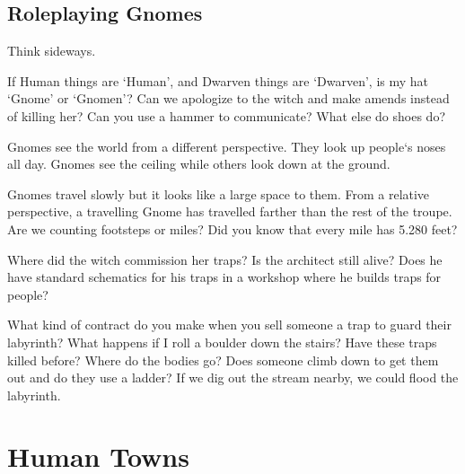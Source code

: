 \begin{multicols}{2}
\subsection{Roleplaying Gnomes}

{\raggedleft Think sideways.\par}
\noindent
If Human things are `Human', and Dwarven things are `Dwarven', is my hat `Gnome' or `Gnomen'?
Can we apologize to the \gls{witch} and make amends instead of killing her?
Can you use a hammer to communicate?
What else do shoes do?

Gnomes see the world from a different perspective.
They look up people`s noses all day.
Gnomes see the ceiling while others look down at the ground.

Gnomes travel slowly but it looks like a large space to them.
From a relative perspective, a travelling Gnome has travelled farther than the rest of the troupe.
Are we counting footsteps or miles?
Did you know that every mile has 5.280 feet?

Where did the \gls{witch} commission her traps?
Is the architect still alive?
Does he have standard schematics for his traps in a workshop where he builds traps for people?

What kind of contract do you make when you sell someone a trap to guard their labyrinth?
What happens if I roll a boulder down the stairs?
Have these traps killed before?
Where do the bodies go?
Does someone climb down to get them out and do they use a ladder?
If we dig out the stream nearby, we could flood the labyrinth.

\end{multicols}

\section[Humans]{Human Towns \Hu}
\label{humanTowns}

